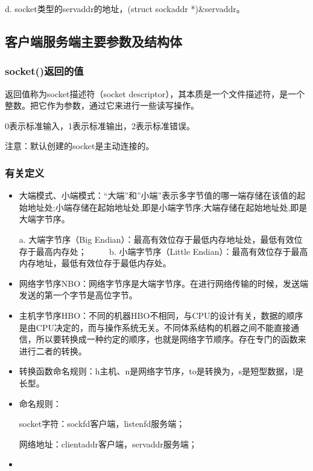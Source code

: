 \documentclass[UTF8]{article}%
\begin{document}
d. socket类型的servaddr的地址，(struct sockaddr *)\&servaddr。

\subsection{客户端服务端主要参数及结构体}

\subsubsection{socket()返回的值}

返回值称为socket描述符（socket descriptor），其本质是一个文件描述符，是一个整数。把它作为参数，通过它来进行一些读写操作。

0表示标准输入，1表示标准输出，2表示标准错误。

注意：默认创建的socket是主动连接的。

\subsubsection{有关定义}

\begin{itemize}
    \item 大端模式、小端模式：“大端”和”小端”表示多字节值的哪一端存储在该值的起始地址处;小端存储在起始地址处,即是小端字节序;大端存储在起始地址处,即是大端字节序。
    
    a. 大端字节序（Big Endian）：最高有效位存于最低内存地址处，最低有效位存于最高内存处；
　　 
    b. 小端字节序（Little Endian）：最高有效位存于最高内存地址，最低有效位存于最低内存处。

    \item 网络字节序NBO：网络字节序是大端字节序。在进行网络传输的时候，发送端发送的第一个字节是高位字节。
    \item 主机字节序HBO：不同的机器HBO不相同，与CPU的设计有关，数据的顺序是由CPU决定的，而与操作系统无关。不同体系结构的机器之间不能直接通信，所以要转换成一种约定的顺序，也就是网络字节顺序。存在专门的函数来进行二者的转换。
    \item 转换函数命名规则：h主机、n是网络字节序，to是转换为，s是短型数据，l是长型。
    \item 命名规则：
    
    socket字符：sockfd客户端，listenfd服务端；

    网络地址：clientaddr客户端，servaddr服务端；
    \item 

\end{itemize}
\end{document}
